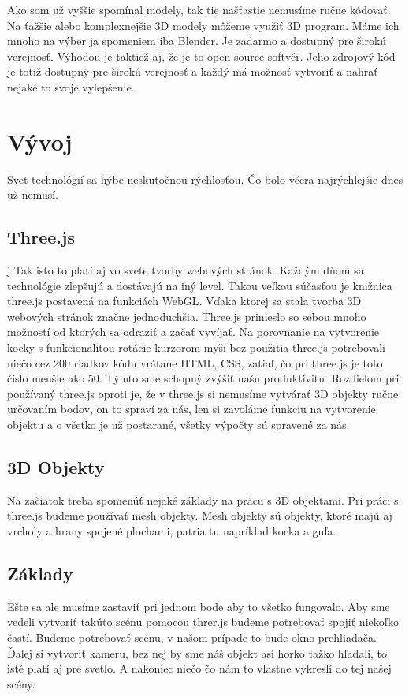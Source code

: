 \documentclass[10pt,twoside,slovak,a4paper]{article}
\begin{document}
Ako som už vyššie spomínal modely, tak tie našťastie nemusíme ručne kódovať. Na ťažšie alebo komplexnejšie 3D modely môžeme využiť 3D program. Máme ich mnoho na výber ja spomeniem iba Blender. Je zadarmo a dostupný pre širokú verejnosť. Výhodou je taktiež aj, že je to open-source softvér. Jeho zdrojový kód je totiž dostupný pre širokú verejnosť a každý má možnosť vytvoriť a nahrať nejaké to svoje vylepšenie.

\section{Vývoj}

Svet technológií sa hýbe neskutočnou rýchlosťou. Čo bolo včera najrýchlejšie dnes už nemusí.

\subsection{Three.js}
j
Tak isto to platí aj vo svete tvorby webových stránok. Každým dňom sa technológie zlepšujú a dostávajú na iný level. Takou veľkou súčasťou je knižnica three.js postavená na funkciách WebGL. Vďaka ktorej sa stala tvorba 3D webových stránok značne jednoduchšia. Three.js prinieslo so sebou mnoho možností od ktorých sa odraziť a začať vyvíjať. Na porovnanie na vytvorenie kocky s funkcionalitou rotácie kurzorom myši bez použitia three.js potrebovali niečo cez 200 riadkov kódu vrátane HTML, CSS, zatiaľ, čo pri three.js je toto číslo menšie ako 50. Týmto sme schopný zvýšiť našu produktivitu. Rozdielom pri používaný three.js oproti je, že v three.js si nemusíme vytvárať 3D objekty ručne určovaním bodov, on to spraví za nás, len si zavoláme funkciu na vytvorenie objektu a o všetko je už postarané, všetky výpočty sú spravené za nás.

\subsection{3D Objekty}

Na začiatok treba spomenúť nejaké základy na prácu s 3D objektami. Pri práci s three.js budeme používať mesh objekty. Mesh objekty sú objekty, ktoré majú aj vrcholy a hrany spojené plochami, patria tu napríklad kocka a guľa. 

\subsection{Základy}

Ešte sa ale musíme zastaviť pri jednom bode aby to všetko fungovalo. Aby sme vedeli vytvoriť takúto scénu pomocou threr.js budeme potrebovať spojiť niekoľko častí. Budeme potrebovať scénu, v našom prípade to bude okno prehliadača. Ďalej si vytvoriť kameru, bez nej by sme náš objekt asi horko ťažko hľadali, to isté platí aj pre svetlo. A nakoniec niečo čo nám to vlastne vykreslí do tej našej scény.
\end{document}
